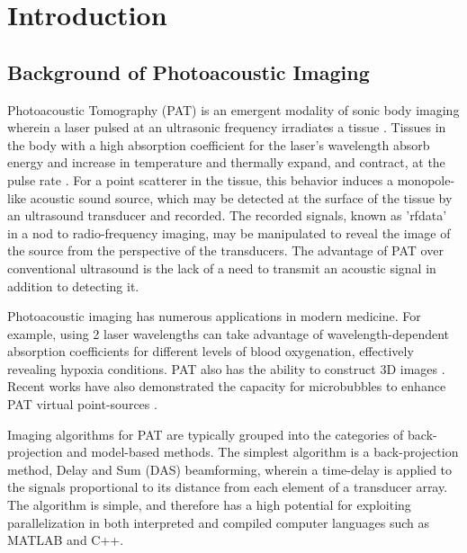 \chapter{Introduction} 
\label{chapter1:introduction}
\graphicspath{{Chapter-1/graphics/}}

\section{Background of Photoacoustic Imaging}
\label{chapter1:backg_photoacoustics}

Photoacoustic Tomography (PAT) is an emergent modality of sonic body imaging wherein a laser pulsed at an ultrasonic frequency irradiates a tissue \cite{xuPhotoacousticImagingBiomedicine2006}. Tissues in the body with a high absorption coefficient for the laser's wavelength absorb energy and increase in temperature and thermally expand, and contract, at the pulse rate \cite{xuPhotoacousticImagingBiomedicine2006}\cite{wangProspectsPhotoacousticTomography2008}. For a point scatterer in the tissue, this behavior induces a monopole-like acoustic sound source, which may be detected at the surface of the tissue by an ultrasound transducer and recorded. The recorded signals, known as 'rfdata' in a nod to radio-frequency imaging, may be manipulated to reveal the image of the source from the perspective of the transducers. The advantage of PAT over conventional ultrasound is the lack of a need to transmit an acoustic signal in addition to detecting it.

Photoacoustic imaging has numerous applications in modern medicine. For example, using 2 laser wavelengths can take advantage of wavelength-dependent absorption coefficients for different levels of blood oxygenation, effectively revealing hypoxia conditions\cite{liSimultaneousMolecularHypoxia2008}\cite{zhangFunctionalPhotoacousticMicroscopy2006}. PAT also has the ability to construct 3D images \cite{zhangFunctionalPhotoacousticMicroscopy2006}. Recent works have also demonstrated the capacity for microbubbles to enhance PAT virtual point-sources \cite{tangHighfidelityDeepFunctional2023a}.

Imaging algorithms for PAT are typically grouped into the categories of back-projection \cite{xuUniversalBackprojectionAlgorithm2005} and model-based methods\cite{fesslerModelBasedImageReconstruction2010}\cite{dean-benPracticalGuideModelbased2022}. The simplest algorithm is a back-projection method, Delay and Sum (DAS) beamforming, wherein a time-delay is applied to the signals proportional to its distance from each element of a transducer array\cite{perrotYouThinkYou2021a}\cite{mckeighenNewTechniquesDynamically1977}\cite{1686435}\cite{maillouxPhasedArrayTheory1982}. The algorithm is simple, and therefore has a high potential for exploiting parallelization in both interpreted and compiled computer languages such as MATLAB and C++.

